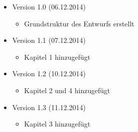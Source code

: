 \documentclass[11pt]{article}
\begin{document}
\begin{itemize}
	\item Version 1.0 (06.12.2014)
	\begin{itemize}
		\item Grundstruktur des Entwurfs erstellt
	\end{itemize}
	\item Version 1.1 (07.12.2014)
	\begin{itemize}
		\item Kapitel 1 hinzugefügt
	\end{itemize}
	\item Version 1.2 (10.12.2014)
	\begin{itemize}
		\item Kapitel 2 und 4 hinzugefügt
	\end{itemize}
	\item Version 1.3 (11.12.2014)
	\begin{itemize}
		\item Kapitel 3 hinzugefügt
	\end{itemize}
\end{itemize}
\end{document}
